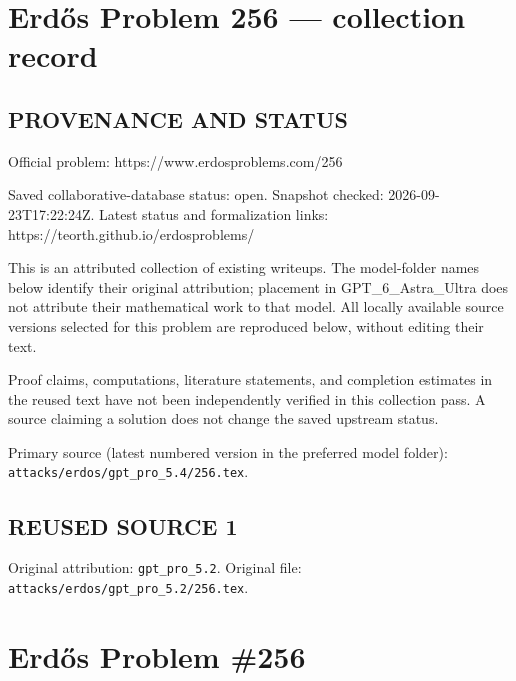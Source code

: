 \section*{Erd\H{o}s Problem 256 --- collection record}

\subsection*{PROVENANCE AND STATUS}
Official problem: https://www.erdosproblems.com/256

Saved collaborative-database status: open.
Snapshot checked: 2026-09-23T17:22:24Z.
Latest status and formalization links: https://teorth.github.io/erdosproblems/

This is an attributed collection of existing writeups. The model-folder names below identify their original attribution; placement in GPT\_6\_Astra\_Ultra does not attribute their mathematical work to that model. All locally available source versions selected for this problem are reproduced below, without editing their text.

Proof claims, computations, literature statements, and completion estimates in the reused text have not been independently verified in this collection pass. A source claiming a solution does not change the saved upstream status.

Primary source (latest numbered version in the preferred model folder): \texttt{attacks/erdos/gpt\_pro\_5.4/256.tex}.

\subsection*{REUSED SOURCE 1}
Original attribution: \texttt{gpt\_pro\_5.2}.
Original file: \texttt{attacks/erdos/gpt\_pro\_5.2/256.tex}.

\section*{Erd\H{o}s Problem \#256}

